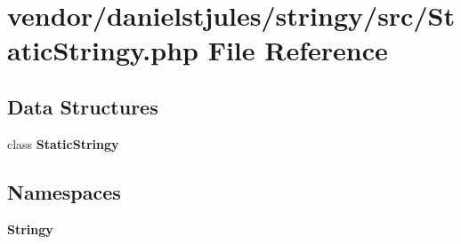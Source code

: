 \section{vendor/danielstjules/stringy/src/\+Static\+Stringy.php File Reference}
\label{_static_stringy_8php}
\subsection*{Data Structures}
\begin{DoxyCompactItemize}
\item 
class {\bf Static\+Stringy}
\end{DoxyCompactItemize}
\subsection*{Namespaces}
\begin{DoxyCompactItemize}
\item 
 {\bf Stringy}
\end{DoxyCompactItemize}
